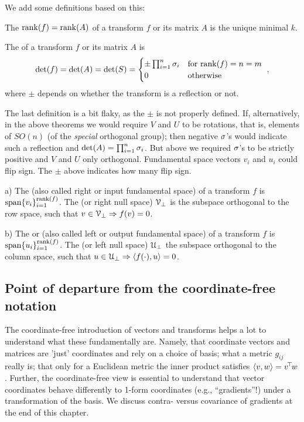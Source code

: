 We add some definitions based on this:
\begin{myDefinition}
The  ${\rm rank}(f)={\rm rank}(A)$ of a transform $f$ or its matrix $A$ is the unique minimal $k$.
\end{myDefinition}

\begin{myDefinition}
The  of a transform $f$ or its matrix $A$ is
\begin{equation}
\det(f) = \det(A) = \det(S) = \begin{cases}
\pm \prod_{i=1}^n \sigma_i & \text{for}~{\rm rank}(f)=n=m \\
0 & \text{otherwise}
\end{cases}~,
\end{equation}
where $\pm$ depends on whether the transform is a
reflection or not.
\end{myDefinition}

The last definition is a bit flaky, as the $\pm$ is not properly
defined. If, alternatively, in the above theorems we would require $V$
and $U$ to be rotations, that is, elements of $SO(n)$ (of
the \emph{special} orthogonal group); then negative $\sigma$'s would
indicate such a reflection and $\det(A) = \prod_{i=1}^n \sigma_i$. But
above we required $\sigma$'s to be strictly positive and $V$ and $U$ only
orthogonal. Fundamental space vectors $v_i$ and $u_i$ could flip
sign. The $\pm$ above indicates how many flip sign.

\begin{myDefinition}
a) The  (also called right or input fundamental
space) of a transform $f$ is
$\operatorname{span}\{v_i\}_{i=1}^{{\rm rank}(f)}$. The  (or
right null space) ${\cal V}_\perp$ is the subspace orthogonal to the row
space, such that $v\in {\cal V}_\perp \Rightarrow f(v)=0$.

b) The  or (also called left or output
fundamental space) of a transform $f$ is
$\operatorname{span}\{u_i\}_{i=1}^{{\rm rank}(f)}$. The  (or
left null space) ${\cal U}_\perp$  the subspace orthogonal to the
column space, such that $u\in {\cal U}_\perp \Rightarrow \langle f(\cdot),u\rangle=0$.
\end{myDefinition}



\subsection{Point of departure from the coordinate-free notation}

The coordinate-free introduction of vectors and transforms helps a
lot to understand what these fundamentally are. Namely, that coordinate
vectors and matrices are 'just' coordinates and rely on a choice of
basis; what a metric $g_{ij}$ really is; that only for a Euclidean
metric the inner product satisfies $\langle v,w\rangle = v^{\!\top\!} w$. Further, the
coordinate-free view is essential to understand that vector
coordinates behave differently to 1-form coordinates (e.g., ``gradients''!)
under a transformation of the basis. We discuss
contra- versus covariance of gradients at the end of this chapter.


